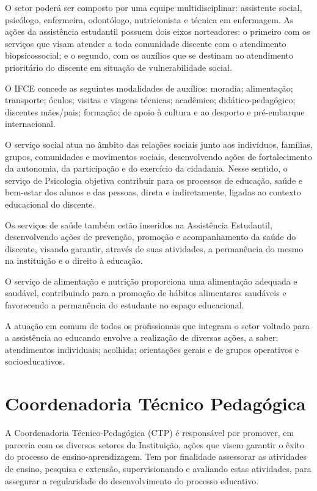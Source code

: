 \documentclass[
	12pt,				%
	openright,			%
	twoside,			%
	a4paper,			%
	chapter=TITLE,		%
	english,			%
	french,				%
	spanish,			%
	brazil,				%
	]{abntex2}
\begin{document}
O setor poderá ser composto por uma equipe multidisciplinar: assistente social, psicólogo,
enfermeira, odontólogo, nutricionista e técnica em enfermagem. As ações da assistência estudantil possuem dois eixos norteadores: o primeiro com os serviços que visam atender a toda comunidade discente com o atendimento biopsicossocial; e o segundo, com os auxílios que se destinam ao atendimento prioritário do discente em situação de vulnerabilidade social.


O IFCE concede as seguintes modalidades de auxílios: moradia; alimentação; transporte; óculos; visitas e viagens técnicas; acadêmico; didático-pedagógico; discentes mães/pais; formação; de apoio à cultura e ao desporto e pré-embarque internacional.

O serviço social atua no âmbito das relações sociais junto aos indivíduos, famílias, grupos, comunidades e movimentos sociais, desenvolvendo ações de fortalecimento da autonomia, da participação e do exercício da cidadania. Nesse sentido, o serviço de Psicologia objetiva contribuir para os processos de educação, saúde e bem-estar dos alunos e das pessoas, direta e indiretamente, ligadas ao contexto educacional do discente.

Os serviços de saúde também estão inseridos na Assistência Estudantil, desenvolvendo ações de prevenção, promoção e acompanhamento da saúde do discente, visando garantir, através de suas atividades, a permanência do mesmo na instituição e o direito à educação.

O serviço de alimentação e nutrição proporciona uma alimentação adequada e saudável, contribuindo para a promoção de hábitos alimentares saudáveis e favorecendo a permanência do estudante no espaço educacional.

A atuação em comum de todos os profissionais que integram o setor voltado para a assistência ao educando envolve a realização de diversas ações, a saber: atendimentos individuais; acolhida; orientações gerais e de grupos operativos e socioeducativos.

\section{Coordenadoria Técnico Pedagógica}
A Coordenadoria Técnico-Pedagógica (CTP) é responsável por promover, em parceria com os diversos setores da Instituição, ações que visem garantir o êxito do processo de ensino-aprendizagem. Tem por finalidade assessorar as atividades de ensino, pesquisa e extensão, supervisionando e avaliando estas atividades, para assegurar a regularidade do desenvolvimento do processo educativo.
\end{document}
